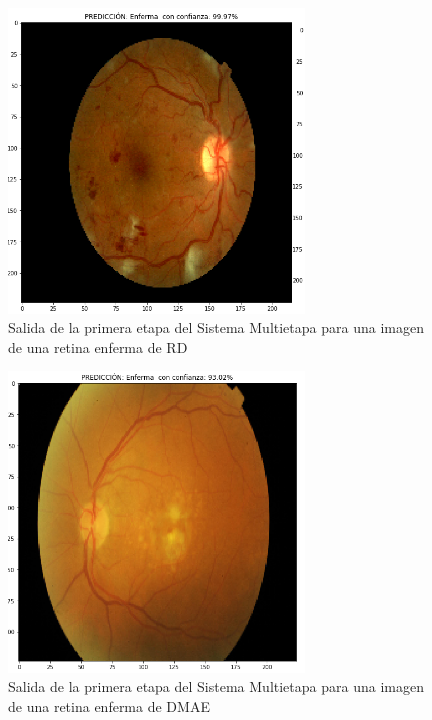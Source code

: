 \documentclass[
  12pt,
  spanish,
  a4paperpaper,
]{report}
\begin{document}
\begin{figure}
\centering
\includegraphics[width=0.7\textwidth,height=\textheight]{source/figures/hnh1.png}
\caption{Salida de la primera etapa del Sistema Multietapa para una
imagen de una retina enferma de RD \label{hnh1}}
\end{figure}

\begin{figure}
\centering
\includegraphics[width=0.7\textwidth,height=\textheight]{source/figures/hnh2.png}
\caption{Salida de la primera etapa del Sistema Multietapa para una
imagen de una retina enferma de DMAE \label{hnh2}}
\end{figure}
\end{document}
